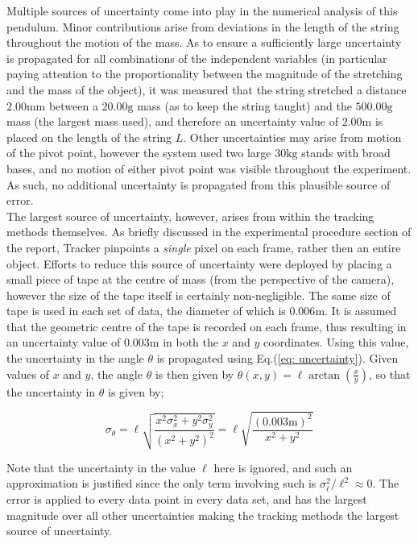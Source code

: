 Multiple sources of uncertainty come into play in the numerical analysis of 
this pendulum. Minor contributions arise from deviations in the length of 
the string throughout the motion of the mass. As to ensure a sufficiently 
large uncertainty is propagated for all combinations of the independent variables 
(in particular paying attention to the proportionality between the magnitude of 
the stretching and the mass of the object), it was measured that the string 
stretched a distance $2.00\text{mm}$ between a $20.00\text{g}$ mass (as to keep 
the string taught) and the $500.00\text{g}$ mass (the largest mass used), and 
therefore an uncertainty value of $2.00\text{m}$ is placed on the length of 
the string $L$. Other uncertainties may arise from motion of the pivot point, 
however the system used two large $30\text{kg}$ stands with broad bases, and 
no motion of either pivot point was visible throughout the experiment. As such, 
no additional uncertainty is propagated from this plausible source of error.\\[0.10cm]

The largest source of uncertainty, however, arises from within the tracking 
methods themselves. As briefly discussed in the experimental procedure section 
of the report, Tracker pinpoints a \emph{single} pixel on each frame, rather 
then an entire object. Efforts to reduce this source of uncertainty were deployed 
by placing a small piece of tape at the centre of mass (from the perspective of the 
camera), however the size of the tape itself is certainly non-negligible. The same 
size of tape is used in each set of data, the diameter of which is $0.006\text{m}$.
 It is assumed that the geometric centre of the tape is recorded on each frame, 
 thus resulting in an uncertainty value of $0.003\text{m}$ in both the $x$ and $y$ 
 coordinates. Using this value, the uncertainty in the angle $\theta$ is propagated 
 using Eq.(\ref{eq: uncertainty}). Given values of $x$ and $y$, the angle $\theta$ 
 is then given by $\theta(x, y) = \ell \arctan\left(\frac{x}{y} \right)$, so that 
 the uncertainty in $\theta$ is given by;

\begin{equation} \label{eq: theta_unc}
    \sigma_\theta = \ell\sqrt{\frac{x^2\sigma_x^2 + y^2\sigma_y^2}{(x^2 + y^2)^2}} = \ell\sqrt{\frac{(0.003\text{m})^2}{x^2 + y^2}}
\end{equation}

Note that the uncertainty in the value $\ell$ here is ignored, and such an 
approximation is justified since the only term involving such is $\sigma_\ell^2/\ell^2 \approx 0$. 
The error is applied to every data point in every data set, and has the largest 
magnitude over all other uncertainties making the tracking methods the largest 
source of uncertainty.\\[0.20cm]

